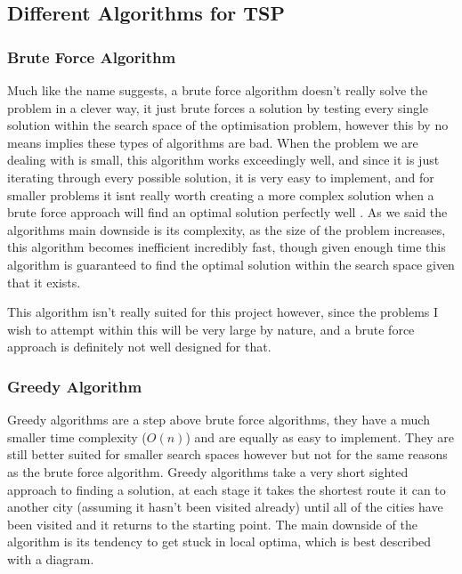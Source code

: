 \documentclass[11pt,a4paper,titlepage]{article}
\begin{document}
\subsection{Different Algorithms for TSP}

\subsubsection{Brute Force Algorithm}

Much like the name suggests, a brute force algorithm doesn't really solve the problem in a clever way, it just brute forces a solution by testing every single solution within the search space of the optimisation problem, however this by no means implies these types of algorithms are bad. When the problem we are dealing with is small, this algorithm works exceedingly well, and since it is just iterating through every possible solution, it is very easy to implement, and for smaller problems it isnt really worth creating a more complex solution when a brute force approach will find an optimal solution perfectly well \cite{DiffAlgs}. As we said the algorithms main downside is its complexity, as the size of the problem increases, this algorithm becomes inefficient incredibly fast, though given enough time this algorithm is guaranteed to find the optimal solution within the search space given that it exists.

This algorithm isn't really suited for this project however, since the problems I wish to attempt within this will be very large by nature, and a brute force approach is definitely not well designed for that.

\subsubsection{Greedy Algorithm}

Greedy algorithms are a step above brute force algorithms, they have a much smaller time complexity ($O(n)$) and are equally as easy to implement. They are still better suited for smaller search spaces however but not for the same reasons as the brute force algorithm. Greedy algorithms take a very short sighted approach to finding a solution, at each stage it takes the shortest route it can to another city (assuming it hasn't been visited already) until all of the cities have been visited and it returns to the starting point. The main downside of the algorithm is its tendency to get stuck in local optima, which is best described with a diagram.
\end{document}
